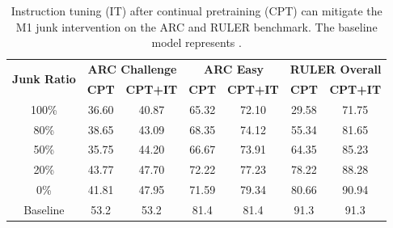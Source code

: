 \begin{table}[ht]
\centering
\small
\caption{Instruction tuning (IT) after continual pretraining (CPT) can mitigate the M1 junk intervention on the ARC and RULER benchmark. The baseline model represents \llama.}
\label{tab:ablation-it}
\begin{tabular}{c|cc|cc|cc}
\toprule
\multirow{2}{*}{\textbf{Junk Ratio}} & \multicolumn{2}{c|}{\textbf{ARC Challenge}} & \multicolumn{2}{c|}{\textbf{ARC Easy}} & \multicolumn{2}{c}{\textbf{RULER Overall}} \\
 & \textbf{CPT} & \textbf{CPT+IT} & \textbf{CPT} & \textbf{CPT+IT} & \textbf{CPT} & \textbf{CPT+IT} \\
\midrule
100\% & 36.60 & 40.87 & 65.32 & 72.10 & 29.58 & 71.75\\
80\% & 38.65 & 43.09 & 68.35 & 74.12 & 55.34 & 81.65 \\
50\% &  35.75 & 44.20 & 66.67 & 73.91 & 64.35 & 85.23\\
20\% &  43.77 & 47.70 & 72.22 & 77.23 & 78.22 & 88.28\\
0\% &  41.81 & 47.95 & 71.59 & 79.34 & 80.66 & 90.94\\
\midrule
Baseline & 53.2 & 53.2 & 81.4 & 81.4 & 91.3 & 91.3 \\
\bottomrule
\end{tabular}
\end{table}




% 
